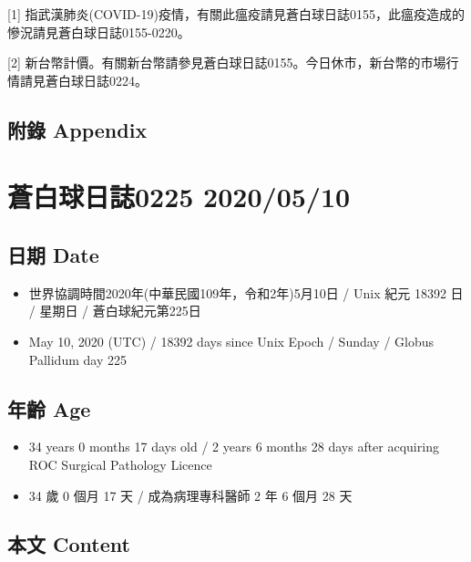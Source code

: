 \documentclass[a5paper, 11pt
]{book}
\providecommand{\tightlist}{%
  \setlength{\itemsep}{0pt}\setlength{\parskip}{0pt}}
\begin{document}
{[}1{]}
指武漢肺炎(COVID-19)疫情，有關此瘟疫請見蒼白球日誌0155，此瘟疫造成的慘況請見蒼白球日誌0155-0220。

{[}2{]}
新台幣計價。有關新台幣請參見蒼白球日誌0155。今日休市，新台幣的市場行情請見蒼白球日誌0224。

\hypertarget{ux9644ux9304-appendix-69}{%
\subsection{附錄 Appendix}\label{ux9644ux9304-appendix-69}}

\hypertarget{ux84bcux767dux7403ux65e5ux8a8c0225-20200510}{%
\section{蒼白球日誌0225
2020/05/10}\label{ux84bcux767dux7403ux65e5ux8a8c0225-20200510}}

\hypertarget{ux65e5ux671f-date-70}{%
\subsection{日期 Date}\label{ux65e5ux671f-date-70}}

\begin{itemize}
\tightlist
\item
  世界協調時間2020年(中華民國109年，令和2年)5月10日 / Unix 紀元 18392 日
  / 星期日 / 蒼白球紀元第225日
\item
  May 10, 2020 (UTC) / 18392 days since Unix Epoch / Sunday / Globus
  Pallidum day 225
\end{itemize}

\hypertarget{ux5e74ux9f61-age-70}{%
\subsection{年齡 Age}\label{ux5e74ux9f61-age-70}}

\begin{itemize}
\tightlist
\item
  34 years 0 months 17 days old / 2 years 6 months 28 days after
  acquiring ROC Surgical Pathology Licence
\item
  34 歲 0 個月 17 天 / 成為病理專科醫師 2 年 6 個月 28 天
\end{itemize}

\hypertarget{ux672cux6587-content-70}{%
\subsection{本文 Content}\label{ux672cux6587-content-70}}
\end{document}
